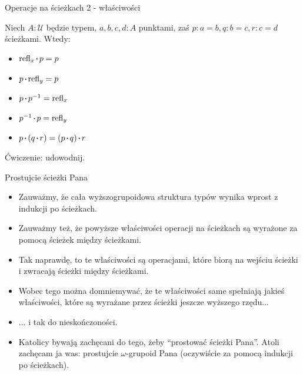 \documentclass{beamer}
\newcommand{\U}{\mathcal{U}}
\newcommand{\refl}[1]{\text{refl}_{#1}}
\newcommand*\sq{\mathbin{\vcenter{\hbox{\rule{.3ex}{.3ex}}}}}
\begin{document}
\begin{frame}{Operacje na ścieżkach 2 - właściwości}

\begin{theorem}

Niech $A : \U$ będzie typem, $a, b, c, d : A$ punktami, zaś $p : a = b, q : b = c, r : c = d$ ścieżkami. Wtedy:

\begin{itemize}
	\item $\refl{x} \sq p = p$
	\item $p \sq \refl{y} = p$
	\item $p \sq p^{-1} = \refl{x}$
	\item $p^{-1} \sq p = \refl{y}$
	\item $p \sq (q \sq r) = (p \sq q) \sq r$
\end{itemize}

\end{theorem}

Ćwiczenie: udowodnij.

\end{frame}

\begin{frame}{Prostujcie ścieżki Pana}
\begin{itemize}
	\item Zauważmy, że cała wyższogrupoidowa struktura typów wynika wprost z indukcji po ścieżkach.
	\item Zauważmy też, że powyższe właściwości operacji na ścieżkach są wyrażone za pomocą ścieżek między ścieżkami.
	\item Tak naprawdę, to te właściwości są operacjami, które biorą na wejściu ścieżki i zwracają ścieżki między ścieżkami.
	\item Wobec tego można domniemywać, że te właściwości same spełniają jakieś właściwości, które są wyrażane przez ścieżki jeszcze wyższego rzędu...
	\item ... i tak do nieskończoności.
	\item Katolicy bywają zachęcani do tego, żeby ``prostować ścieżki Pana''. Atoli zachęcam ja was: prostujcie $\omega$-grupoid Pana (oczywiście za pomocą indukcji po ścieżkach).
\end{itemize}
\end{frame}
\end{document}
